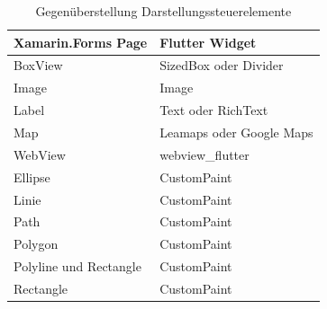 \begin{table}[!ht]
\begin{tabularx}{\textwidth}{X|X}
   \textbf{Xamarin.Forms Page} & \textbf{Flutter Widget}  \\
\hline
	BoxView		       			&   	 SizedBox oder 	Divider 		\\ 
	Image       						&	     Image	 			\\ 
	Label       						&  	Text oder RichText 			\\ 
	Map            					&	   	Leamaps oder Google Maps \\ 
	WebView            			&  	webview\_flutter	\\ 
	Ellipse							&  	CustomPaint	\\ 
	Linie								&	  	CustomPaint	\\ 
	Path  							&  	CustomPaint	\\ 
	Polygon  						&  	CustomPaint	\\ 
	Polyline und Rectangle  &  	CustomPaint	\\ 
	Rectangle  					&  	CustomPaint	\\ 

\end{tabularx}
\caption{Gegenüberstellung Darstellungssteuerelemente}
 \label{tab:ControlsVisualization}
\end{table}

